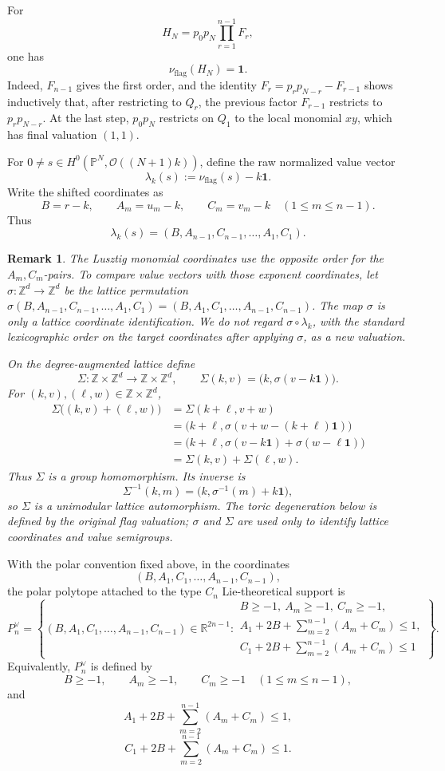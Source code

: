\documentclass{article}
\newtheorem{rmk}[thm]{Remark}
\newcommand{\ZZ}{\mathbb{Z}}
\newcommand{\RR}{\mathbb{R}}
\newcommand{\PP}{\mathbb{P}}
\begin{document}
For
\[
H_N=p_0p_N\prod_{r=1}^{n-1}F_r,
\]
one has
\[
\nu_{\mathrm{flag}}(H_N)=\mathbf 1.
\]
Indeed, \(F_{n-1}\) gives the first order, and the identity \(F_r=p_rp_{N-r}-F_{r-1}\) shows inductively that, after restricting to \(Q_r\), the previous factor \(F_{r-1}\) restricts to \(p_rp_{N-r}\). At the last step, \(p_0p_N\) restricts on \(Q_1\) to the local monomial \(xy\), which has final valuation \((1,1)\).

For \(0\ne s\in H^0(\PP^N,\mathcal O((N+1)k))\), define the raw normalized value vector
\[
\lambda_k(s):=\nu_{\mathrm{flag}}(s)-k\mathbf 1.
\]
Write the shifted coordinates as
\[
B=r-k,
\qquad
A_m=u_m-k,
\qquad
C_m=v_m-k
\quad(1\le m\le n-1).
\]
Thus
\[
\lambda_k(s)
=
(B,A_{n-1},C_{n-1},\ldots,A_1,C_1).
\]

\begin{rmk}\label{rmk:lattice-identification}
The Lusztig monomial coordinates use the opposite order for the \(A_m,C_m\)-pairs. To compare value vectors with those exponent coordinates, let \(\sigma:\ZZ^d\longrightarrow\ZZ^d\) be the lattice permutation \(\sigma(B,A_{n-1},C_{n-1},\ldots,A_1,C_1)=(B,A_1,C_1,\ldots,A_{n-1},C_{n-1})\).
The map \(\sigma\) is only a lattice coordinate identification. We do not regard \(\sigma\circ\lambda_k\), with the standard lexicographic order on the target coordinates after applying \(\sigma\), as a new valuation.

On the degree-augmented lattice define
\[
\Sigma:\ZZ\times\ZZ^d\longrightarrow\ZZ\times\ZZ^d,
\qquad
\Sigma(k,v)=\bigl(k,\sigma(v-k\mathbf 1)\bigr).
\]
For \((k,v),(\ell,w)\in\ZZ\times\ZZ^d\),
\[
\begin{aligned}
\Sigma\bigl((k,v)+(\ell,w)\bigr)
&=
\Sigma(k+\ell,v+w)\\
&=
\bigl(k+\ell,\sigma(v+w-(k+\ell)\mathbf 1)\bigr)\\
&=
\bigl(k+\ell,\sigma(v-k\mathbf 1)+\sigma(w-\ell\mathbf 1)\bigr)\\
&=
\Sigma(k,v)+\Sigma(\ell,w).
\end{aligned}
\]
Thus \(\Sigma\) is a group homomorphism. Its inverse is
\[
\Sigma^{-1}(k,m)=\bigl(k,\sigma^{-1}(m)+k\mathbf 1\bigr),
\]
so \(\Sigma\) is a unimodular lattice automorphism. The toric degeneration below is defined by the original flag valuation; \(\sigma\) and \(\Sigma\) are used only to identify lattice coordinates and value semigroups.
\end{rmk}

With the polar convention fixed above, in the coordinates
\[
(B,A_1,C_1,\ldots,A_{n-1},C_{n-1}),
\]
the polar polytope attached to the type \(C_n\) Lie-theoretical support is
\[
P_n^\vee=\left\{(B,A_1,C_1,\ldots,A_{n-1},C_{n-1})\in\RR^{2n-1}:
\begin{array}{l}
B\ge -1,\ A_m\ge -1,\ C_m\ge -1,\\
A_1+2B+\sum_{m=2}^{n-1}(A_m+C_m)\le1,\\
C_1+2B+\sum_{m=2}^{n-1}(A_m+C_m)\le1
\end{array}
\right\}.
\]
Equivalently, \(P_n^\vee\) is defined by
\[
B\ge -1,
\qquad
A_m\ge -1,
\qquad
C_m\ge -1
\quad(1\le m\le n-1),
\]
and
\[
A_1+2B+\sum_{m=2}^{n-1}(A_m+C_m)\le1,
\]
\[
C_1+2B+\sum_{m=2}^{n-1}(A_m+C_m)\le1.
\]
\end{document}
